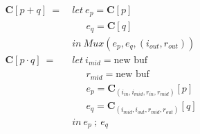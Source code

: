 \documentclass[12pt, letterpaper]{article}
\begin{document}
{\begin{align*}
         \mathbf{C}[p + q]\ 
             =\ &
             let\ e_p = \mathbf{C}[p]\\
             &\quad\ \ e_q = \mathbf{C}[q]\\
             &in\ Mux(e_p, e_q, (i_{out},r_{out}))
             \\
         \mathbf{C}[p \cdot q]\ 
             =\ &
             let\ i_{mid} = \text{new buf}\\
             &\quad\ \ r_{mid} = \text{new buf}\\
             &\quad\ \ e_p = \mathbf{C}_{(i_{in}, i_{mid}, r_{in}, r_{mid})}[p]\\
             &\quad\ \ e_q = \mathbf{C}_{(i_{mid}, i_{out}, r_{mid}, r_{out})}[q]\\
             &in\ e_p\ ;\ e_q
     \end{align*}
 }
\end{document}

